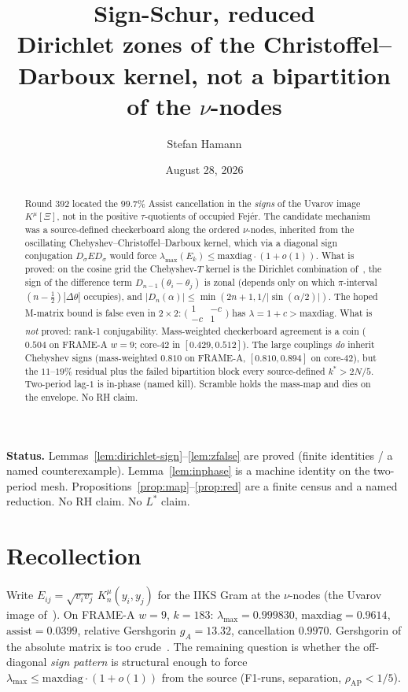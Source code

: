 \documentclass[11pt]{article}
\title{\bfseries Sign-Schur, reduced\\[2mm]
\large Dirichlet zones of the Christoffel--Darboux kernel,
not a bipartition of the $\nu$-nodes}
\author{Stefan Hamann}
\date{August 28, 2026}
\theoremstyle{remark}
\begin{document}
\maketitle

\begin{abstract}\noindent
Round 392 located the $99.7\%$ Assist cancellation in the
\emph{signs} of the Uvarov image $K^\mu[\Xi]$, not in the
positive $\tau$-quotients of occupied Fej\'er.
The candidate mechanism was a source-defined checkerboard
along the ordered $\nu$-nodes, inherited from the oscillating
Chebyshev--Christoffel--Darboux kernel, which via a diagonal
sign conjugation $D_\sigma E D_\sigma$ would force
$\lambda_{\max}(E_k)\le\mathrm{maxdiag}\cdot(1+o(1))$.
What is proved: on the cosine grid the Chebyshev-$T$ kernel
is the Dirichlet combination of~\cite{r387}, the sign of the
difference term
$D_{n-1}(\theta_i-\theta_j)$ is zonal
(depends only on which $\pi$-interval $(n-\tfrac12)|\Delta\theta|$
occupies), and
$\lvert D_n(\alpha)\rvert\le\min(2n+1,1/\lvert\sin(\alpha/2)\rvert)$.
The hoped M-matrix bound is false even in $2\times 2$:
$\bigl(\begin{smallmatrix}1&-c\\-c&1\end{smallmatrix}\bigr)$
has $\lambda=1+c>\mathrm{maxdiag}$.
What is \emph{not} proved: rank-1 conjugability.
Mass-weighted checkerboard agreement is a coin ($0.504$ on
FRAME-A $w=9$; core-$42$ in $[0.429,0.512]$).
The large couplings \emph{do} inherit Chebyshev signs
(mass-weighted $0.810$ on FRAME-A, $[0.810,0.894]$ on core-$42$),
but the $11$--$19\%$ residual plus the failed bipartition block
every source-defined $k^*>2N/5$.
Two-period lag-$1$ is in-phase (named kill).
Scramble holds the mass-map and dies on the envelope.
No RH claim.
\end{abstract}

\medskip\noindent
\textbf{Status.}\enspace
Lemmas~\ref{lem:dirichlet-sign}--\ref{lem:zfalse} are proved
(finite identities / a named counterexample).
Lemma~\ref{lem:inphase} is a machine identity on the two-period
mesh.
Propositions~\ref{prop:map}--\ref{prop:red} are a finite census
and a named reduction.
No RH claim.  No $L^*$ claim.

\section{Recollection}\label{sec:rec}

Write $E_{ij}=\sqrt{v_i v_j}\,K_n^\mu(y_i,y_j)$ for the
IIKS Gram at the $\nu$-nodes (the Uvarov image of~\cite{r392}).
On FRAME-A $w=9$, $k=183$:
$\lambda_{\max}=0.999830$, $\mathrm{maxdiag}=0.9614$,
$\mathrm{assist}=0.0399$, relative Gershgorin $g_A=13.32$,
cancellation $0.9970$.
Gershgorin of the absolute matrix is too crude~\cite{r387}.
The remaining question is whether the off-diagonal
\emph{sign pattern} is structural enough to force
$\lambda_{\max}\le\mathrm{maxdiag}\cdot(1+o(1))$ from the
source (F1-runs, separation, $\rho_{\mathrm{AP}}<1/5$).
\end{document}
